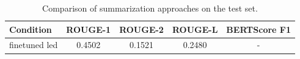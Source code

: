 \begin{table}[h]
\centering
\begin{tabular}{lcccc}
\hline
\textbf{Condition} & \textbf{ROUGE-1} & \textbf{ROUGE-2} & \textbf{ROUGE-L} & \textbf{BERTScore F1} \\
\hline
finetuned led & 0.4502 & 0.1521 & 0.2480 & - \\
\hline
\end{tabular}
\caption{Comparison of summarization approaches on the test set.}
\label{tab:results}
\end{table}
